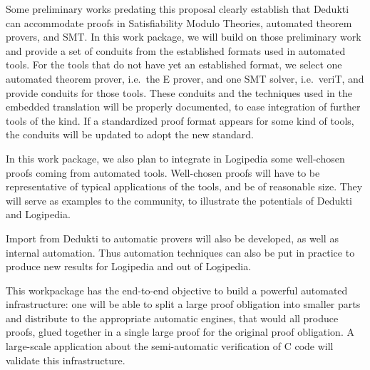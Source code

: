 \begin{workpackage}
\begin{wpdescription}
Some preliminary works predating this proposal clearly establish that Dedukti
can accommodate proofs in Satisfiability Modulo Theories, automated theorem
provers, and SMT.  In this work package, we will build on those preliminary work
and provide a set of conduits from the established formats used in automated
tools. For the tools that do not have yet an established format, we select one
automated theorem prover, i.e.\ the E prover, and one SMT solver, i.e.\ veriT,
and provide conduits for those tools.  These conduits and the techniques used
in the embedded translation will be properly documented, to ease integration of
further tools of the kind.  If a standardized proof format appears for some kind
of tools, the conduits will be updated to adopt the new standard.

In this work package, we also plan to integrate in Logipedia some well-chosen
proofs coming from automated tools.  Well-chosen proofs will have to be
representative of typical applications of the tools, and be of reasonable size.
They will serve as examples to the community, to illustrate the potentials of
Dedukti and Logipedia.

Import from Dedukti to automatic provers will also be developed, as well as
internal automation. Thus automation techniques can also be put in practice to
produce new results for Logipedia and out of Logipedia.

This workpackage has the end-to-end objective to build a powerful automated
infrastructure: one will be able to split a large proof obligation into smaller
parts and distribute to the appropriate automatic engines, that would all
produce proofs, glued together in a single large proof for the original proof
obligation. A large-scale application about the semi-automatic verification of C
code will validate this infrastructure.
\end{wpdescription}


\begin{tasklist}
  \begin{task}[id=instrumenting,
      title=Instrumenting ATPs to produce traces,
      lead=Lie,
      LieRM=28,
      ImtRM=0,
      OcaRM=12,
      BelRM=6,
    ]


\end{task}
\end{tasklist}
\end{workpackage}
